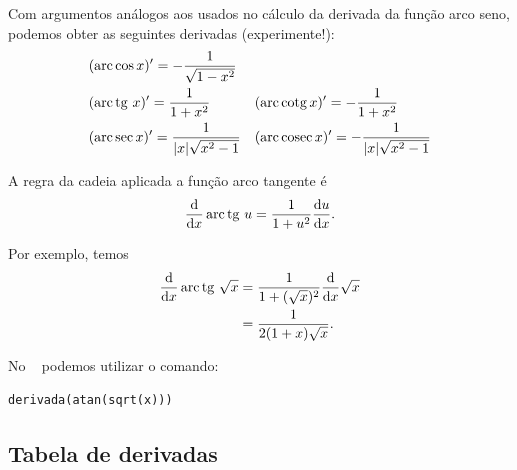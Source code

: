 \cleardoublepage\documentclass[../main.tex]{subfiles}
\begin{document}
Com argumentos análogos aos usados no cálculo da derivada da função arco seno, podemos obter as seguintes derivadas (\dica experimente!):
\begin{align*}
  & (\operatorname{arc}\cos x)' = -\frac{1}{\sqrt{1-x^2}} && \\
  &(\operatorname{arc}\operatorname{tg}\, x)' = \frac{1}{1+x^2} && (\operatorname{arc}\operatorname{cotg} x)' = -\frac{1}{1+x^2} \\
  & (\operatorname{arc}\sec x)' = \frac{1}{|x|\sqrt{x^2-1}} && (\operatorname{arc}\operatorname{cosec} x)' = -\frac{1}{|x|\sqrt{x^2-1}}
\end{align*}

\begin{ex}
  A regra da cadeia aplicada a função arco tangente é
  \begin{equation}
    \frac{\mathrm{d}}{\mathrm{d} x}\operatorname{arc}\operatorname{tg}\, u = \frac{1}{1+u^2}\frac{\mathrm{d} u}{\mathrm{d} x}.
  \end{equation}

  Por exemplo, temos
  \begin{align*}
    \frac{\mathrm{d}}{\mathrm{d} x}\operatorname{arc}\operatorname{tg}\,\sqrt{x} &= \frac{1}{1+(\sqrt{x})^2}\frac{\mathrm{d}}{\mathrm{d} x}\sqrt{x} \\
                                     &=  \frac{1}{2(1+x)\sqrt{x}}.
  \end{align*}

  
  No \geogebra~ podemos utilizar o comando:
\begin{verbatim}
derivada(atan(sqrt(x)))
\end{verbatim}
    
\end{ex}

\subsection{Tabela de derivadas}\label{deriv_tabela_de_derivadas}
\end{document}
